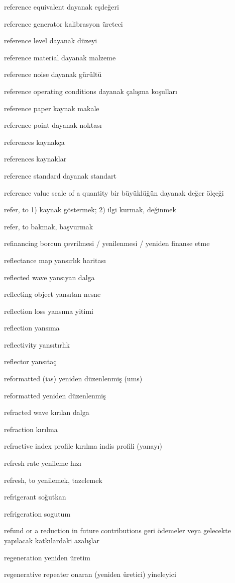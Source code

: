 \documentclass[12pt,fleqn]{article}\usepackage{../../common}
\begin{document}
reference equivalent dayanak eşdeğeri

reference generator kalibrasyon üreteci

reference level dayanak düzeyi

reference material dayanak malzeme

reference noise dayanak gürültü

reference operating conditions dayanak çalışma koşulları

reference paper kaynak makale

reference point dayanak noktası

references kaynakça

references kaynaklar

reference standard dayanak standart

reference value scale of a quantity bir büyüklüğün dayanak değer ölçeği

refer, to 1) kaynak göstermek; 2) ilgi kurmak, değinmek

refer, to bakmak, başvurmak

refinancing borcun çevrilmesi / yenilenmesi / yeniden finanse etme

reflectance map yansırlık haritası

reflected wave yansıyan dalga

reflecting object yansıtan nesne

reflection loss yansıma yitimi

reflection yansıma

reflectivity yansıtırlık

reflector yansıtaç

reformatted (ias) yeniden düzenlenmiş (ums)

reformatted yeniden düzenlenmiş

refracted wave kırılan dalga

refraction kırılma

refractive index profile kırılma indis profili (yanayı)

refresh rate yenileme hızı

refresh, to yenilemek, tazelemek

refrigerant soğutkan

refrigeration sogutum

refund or a reduction in future contributions geri ödemeler veya gelecekte yapılacak katkılardaki azalışlar

regeneration yeniden üretim

regenerative repeater onaran (yeniden üretici) yineleyici
\end{document}
